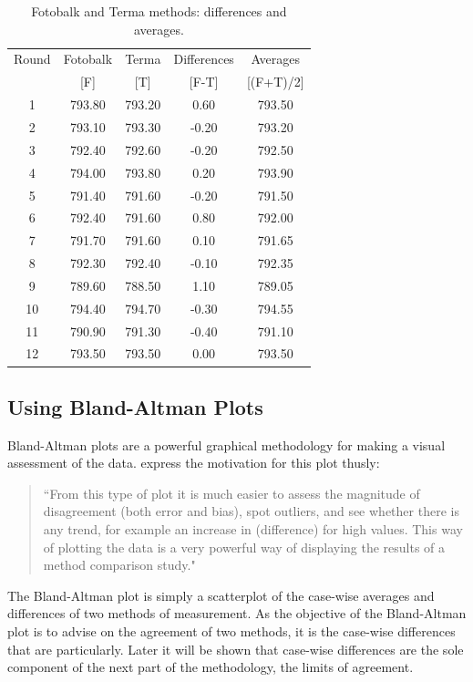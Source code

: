 \documentclass[12pt, a4paper]{report}
\begin{document}
\begin{table}[h!]
\renewcommand\arraystretch{0.7}%
\begin{center}
\begin{tabular}{|c||c|c||c|c|}
  \hline
 Round & Fotobalk  & Terma  & Differences  & Averages  \\
  &  [F] & [T] & [F-T] &  [(F+T)/2] \\
  \hline
1 & 793.80 & 793.20 & 0.60 & 793.50 \\
  2 & 793.10 & 793.30 & -0.20 & 793.20 \\
  3 & 792.40 & 792.60 & -0.20 & 792.50 \\
  4 & 794.00 & 793.80 & 0.20 & 793.90 \\
  5 & 791.40 & 791.60 & -0.20 & 791.50 \\
  6 & 792.40 & 791.60 & 0.80 & 792.00 \\
  7 & 791.70 & 791.60 & 0.10 & 791.65 \\
  8 & 792.30 & 792.40 & -0.10 & 792.35 \\
  9 & 789.60 & 788.50 & 1.10 & 789.05 \\
  10 & 794.40 & 794.70 & -0.30 & 794.55 \\
  11 & 790.90 & 791.30 & -0.40 & 791.10 \\
  12 & 793.50 & 793.50 & 0.00 & 793.50 \\

   \hline
\end{tabular}
\caption{Fotobalk and Terma methods: differences and averages.}
\end{center}
\end{table}

\newpage


\subsection{Using Bland-Altman Plots}
Bland-Altman plots are a powerful graphical methodology for making
a visual assessment of the data. \citet*{BA83} express the
motivation for this plot thusly:
\begin{quote}
``From this type of plot it is much easier to assess the magnitude
of disagreement (both error and bias), spot outliers, and see
whether there is any trend, for example an increase in
(difference) for high values. This way of plotting the data is a
very powerful way of displaying the results of a method comparison
study."
\end{quote}

The Bland-Altman plot is simply a scatterplot of the case-wise
averages and differences of two methods of measurement. As the
objective of the Bland-Altman plot is to advise on the agreement
of two methods, it is the case-wise differences that are
particularly. Later it will be shown that case-wise differences
are the sole component of the next part of the methodology, the
limits of agreement.
\end{document}
